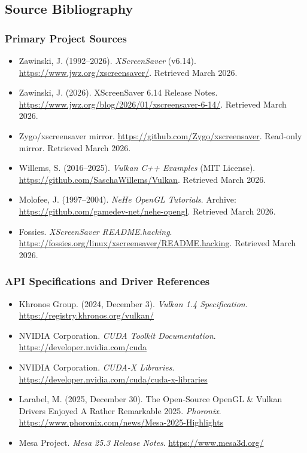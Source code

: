\documentclass[11pt,letterpaper]{article}
\begin{document}
\subsection{Source Bibliography}

\subsubsection{Primary Project Sources}

\begin{itemize}
\item Zawinski, J. (1992--2026). \textit{XScreenSaver} (v6.14). \url{https://www.jwz.org/xscreensaver/}. Retrieved March 2026.
\item Zawinski, J. (2026). XScreenSaver 6.14 Release Notes. \url{https://www.jwz.org/blog/2026/01/xscreensaver-6-14/}. Retrieved March 2026.
\item Zygo/xscreensaver mirror. \url{https://github.com/Zygo/xscreensaver}. Read-only mirror. Retrieved March 2026.
\item Willems, S. (2016--2025). \textit{Vulkan C++ Examples} (MIT License). \url{https://github.com/SaschaWillems/Vulkan}. Retrieved March 2026.
\item Molofee, J. (1997--2004). \textit{NeHe OpenGL Tutorials}. Archive: \url{https://github.com/gamedev-net/nehe-opengl}. Retrieved March 2026.
\item Fossies. \textit{XScreenSaver README.hacking}. \url{https://fossies.org/linux/xscreensaver/README.hacking}. Retrieved March 2026.
\end{itemize}

\subsubsection{API Specifications and Driver References}

\begin{itemize}
\item Khronos Group. (2024, December 3). \textit{Vulkan 1.4 Specification}. \url{https://registry.khronos.org/vulkan/}
\item NVIDIA Corporation. \textit{CUDA Toolkit Documentation}. \url{https://developer.nvidia.com/cuda}
\item NVIDIA Corporation. \textit{CUDA-X Libraries}. \url{https://developer.nvidia.com/cuda/cuda-x-libraries}
\item Larabel, M. (2025, December 30). The Open-Source OpenGL \& Vulkan Drivers Enjoyed A Rather Remarkable 2025. \textit{Phoronix}. \url{https://www.phoronix.com/news/Mesa-2025-Highlights}
\item Mesa Project. \textit{Mesa 25.3 Release Notes}. \url{https://www.mesa3d.org/}
\end{itemize}
\end{document}
